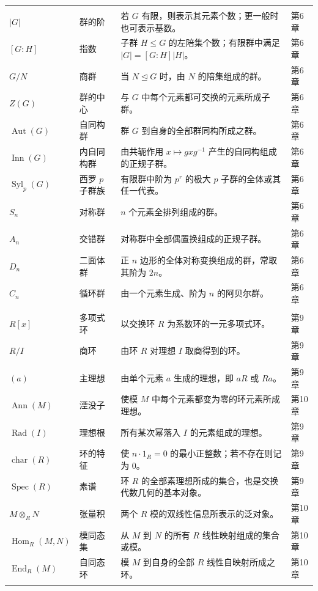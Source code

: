 \begin{longtable}{@{}>{\raggedright\arraybackslash}p{}>{\raggedright\arraybackslash}p{}>{\raggedright\arraybackslash}p{}>{\raggedright\arraybackslash}p{}@{}}
\multicolumn{4}{@{}l}{\textbf{三、群论}}\\
\addlinespace[0.3em]
$|G|$ & 群的阶 & 若 $G$ 有限，则表示其元素个数；更一般时也可表示基数。 & 第6章 \\
$[G:H]$ & 指数 & 子群 $H\leq G$ 的左陪集个数；有限群中满足 $|G|=[G:H]|H|$。 & 第6章 \\
$G/N$ & 商群 & 当 $N\trianglelefteq G$ 时，由 $N$ 的陪集组成的群。 & 第6章 \\
$Z(G)$ & 群的中心 & 与 $G$ 中每个元素都可交换的元素所成子群。 & 第6章 \\
$\operatorname{Aut}(G)$ & 自同构群 & 群 $G$ 到自身的全部群同构所成之群。 & 第6章 \\
$\operatorname{Inn}(G)$ & 内自同构群 & 由共轭作用 $x\mapsto gxg^{-1}$ 产生的自同构组成的正规子群。 & 第6章 \\
$\operatorname{Syl}_p(G)$ & 西罗 $p$ 子群族 & 有限群中阶为 $p^r$ 的极大 $p$ 子群的全体或其任一代表。 & 第6章 \\
$S_n$ & 对称群 & $n$ 个元素全排列组成的群。 & 第6章 \\
$A_n$ & 交错群 & 对称群中全部偶置换组成的正规子群。 & 第6章 \\
$D_n$ & 二面体群 & 正 $n$ 边形的全体对称变换组成的群，常取其阶为 $2n$。 & 第6章 \\
$C_n$ & 循环群 & 由一个元素生成、阶为 $n$ 的阿贝尔群。 & 第6章 \\
\addlinespace[0.6em]

\multicolumn{4}{@{}l}{\textbf{四、环与模}}\\
\addlinespace[0.3em]
$R[x]$ & 多项式环 & 以交换环 $R$ 为系数环的一元多项式环。 & 第9章 \\
$R/I$ & 商环 & 由环 $R$ 对理想 $I$ 取商得到的环。 & 第9章 \\
$(a)$ & 主理想 & 由单个元素 $a$ 生成的理想，即 $aR$ 或 $Ra$。 & 第9章 \\
$\operatorname{Ann}(M)$ & 湮没子 & 使模 $M$ 中每个元素都变为零的环元素所成理想。 & 第10章 \\
$\operatorname{Rad}(I)$ & 理想根 & 所有某次幂落入 $I$ 的元素组成的理想。 & 第9章 \\
$\operatorname{char}(R)$ & 环的特征 & 使 $n\cdot 1_R=0$ 的最小正整数；若不存在则记为 $0$。 & 第9章 \\
$\operatorname{Spec}(R)$ & 素谱 & 环 $R$ 的全部素理想所成的集合，也是交换代数几何的基本对象。 & 第9章 \\
$M\otimes_R N$ & 张量积 & 两个 $R$ 模的双线性信息所表示的泛对象。 & 第10章 \\
$\operatorname{Hom}_R(M,N)$ & 模同态集 & 从 $M$ 到 $N$ 的所有 $R$ 线性映射组成的集合或模。 & 第10章 \\
$\operatorname{End}_R(M)$ & 自同态环 & 模 $M$ 到自身的全部 $R$ 线性自映射所成之环。 & 第10章 \\
\addlinespace[0.6em]


\end{longtable}
